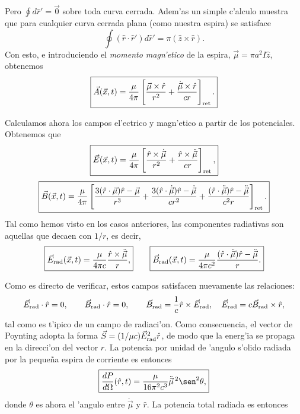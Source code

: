 Pero $\oint d\hat{r}'=\vec{0}$ sobre toda curva cerrada. Adem'as un simple c'alculo muestra que para cualquier curva cerrada plana (como nuestra espira) se satisface 
\begin{equation}
\oint(\hat{r}\cdot\hat{r}')d\hat{r}'=\pi(\hat{z}\times\hat{r}) .
\end{equation}
Con esto, e introduciendo el \textit{momento magn'etico} de la espira, $\vec{\mu}=\pi a^2I\hat{z}$, obtenemos
\begin{equation}
 \boxed{\vec{A}(\vec{x},t)=\frac{\mu}{4\pi}\left[\frac{\vec{\mu}\times\hat{r}}{r^2}+\frac{\dot{\vec{\mu}}\times\hat{r}}{cr}\right]_{\rm ret}.}
\end{equation}

Calculamos ahora los campos el'ectrico y magn'etico a partir de los potenciales. Obtenemos que
\begin{equation}
 \boxed{\vec{E}(\vec{x},t)=\frac{\mu}{4\pi}\left[\frac{\hat{r}\times\dot{\vec{\mu}}}{r^2}+\frac{\hat{r}\times\ddot{\vec{\mu}}}{cr}\right]_{\rm ret},}
\end{equation}
\begin{equation}
\boxed{ \vec{B}(\vec{x},t)=\frac{\mu}{4\pi}\left[\frac{3(\hat{r}\cdot\vec{\mu})\hat{r}-\vec{\mu}}{r^3}+\frac{3(\hat{r}\cdot\dot{\vec{\mu}})\hat{r}-\dot{\vec{\mu}}}{cr^2}+\frac{(\hat{r}\cdot\ddot{\vec{\mu}})\hat{r}-\ddot{\vec{\mu}}}{c^2r}\right]_{\rm ret}.}
\end{equation}
Tal como hemos visto en los casos anteriores, las componentes radiativas son aquellas que decaen con $1/r$, es decir,
\begin{equation}
 \boxed{\vec{E}_{\rm rad}(\vec{x},t)
=\frac{\mu}{4\pi c}\frac{\hat{r}\times\ddot{\vec{\mu}}}{r},} \qquad
 \boxed{\vec{B}_{\rm rad}(\vec{x},t)=\frac{\mu}{4\pi c^2}\frac{(\hat{r}\cdot\ddot{\vec{\mu}})\hat{r}-\ddot{\vec{\mu}}}{r}.}
\end{equation}

Como es directo de verificar, estos campos satisfacen nuevamente las relaciones:
\begin{equation}
\vec{E}_{\rm rad}\cdot\hat{r}=0, \qquad \vec{B}_{\rm rad}\cdot\hat{r}=0, \qquad \vec{B}_{\rm rad}=\frac{1}{c}\hat{r}\times\vec{E}_{\rm rad}, \quad \vec{E}_{\rm rad}=c\vec{B}_{\rm rad}\times\hat{r},
\end{equation}
tal como es t'ipico de un campo de radiaci'on. Como consecuencia, el vector de Poynting adopta la forma $\vec{S}=(1/\mu c)\vec{E}_{\rm rad}^2\hat{r}$, de modo que la energ'ia se propaga en la direcci'on del vector $\hat{r}$. La potencia por unidad de 'angulo s'olido radiada por la peque\~na espira de corriente es entonces
\begin{equation}
\boxed{\frac{dP}{d\Omega}(\hat{r},t)=\frac{\mu}{16\pi^2 c^3}\ddot{\vec{\mu}}{\,}^2\sen^2\theta ,}
\end{equation}
donde $\theta$ es ahora el 'angulo entre $\ddot{\vec{\mu}}$ y $\hat{r}$. La potencia total radiada es entonces

